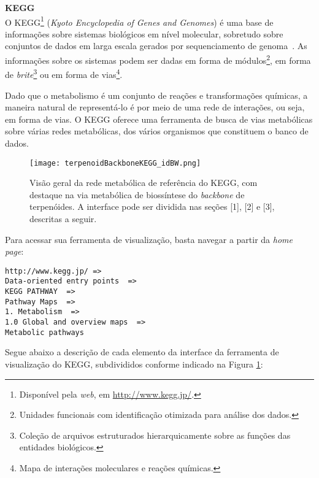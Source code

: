 
\textbf{KEGG} \\

\indent O KEGG\footnote{Disponível pela \textit{web}, em \url{http://www.kegg.jp/}.} (\textit{Kyoto Encyclopedia of Genes and Genomes}) é uma base de informações sobre sistemas biológicos em nível molecular, sobretudo sobre conjuntos de dados em larga escala gerados por sequenciamento de genoma~\cite{keggOverview}. As informações sobre os sistemas podem ser dadas em forma de módulos\footnote{Unidades funcionais com identificação otimizada para análise dos dados.}, em forma de \textit{brite}\footnote{Coleção de arquivos estruturados hierarquicamente sobre as funções das entidades biológicos.} ou em forma de vias\footnote{Mapa de interações moleculares e reações químicas.}.

\indent Dado que o metabolismo é um conjunto de reações e transformações químicas, a maneira natural de representá-lo é por meio de uma rede de interações, ou seja, em forma de vias. O KEGG oferece uma ferramenta de busca de vias metabólicas sobre várias redes metabólicas, dos vários organismos que constituem o banco de dados.

\begin{figure}[!h]
\centering
\texttt{[image: terpenoidBackboneKEGG\_idBW.png]}
\caption{Visão geral da rede metabólica de referência do KEGG, com destaque na via metabólica de biossíntese do \textit{backbone} de terpenóides. A interface pode ser dividida nas seções [1], [2] e [3], descritas a seguir.}
\label{terpenoidBackboneKEGG_id}
\end{figure}

\indent Para acessar sua ferramenta de visualização, basta navegar a partir da \textit{home page}:

\begin{lstlisting}
http://www.kegg.jp/ =>
Data-oriented entry points  =>
KEGG PATHWAY  =>  
Pathway Maps  =>
1. Metabolism  =>
1.0 Global and overview maps  =>
Metabolic pathways
\end{lstlisting}

\indent Segue abaixo a descrição de cada elemento da interface da ferramenta de visualização do KEGG, subdivididos conforme indicado na Figura \ref{terpenoidBackboneKEGG_id}:

